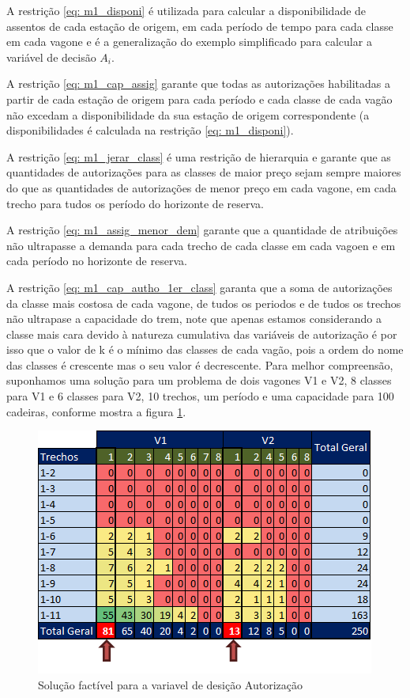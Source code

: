 A restrição \ref{eq: m1_disponi} é utilizada para calcular a disponibilidade de assentos de cada estação de origem, em cada período de tempo para cada classe em cada vagone e é a generalização do exemplo simplificado para calcular a variável de decisão $A_i$.

A restrição \ref{eq: m1_cap_assig} garante que todas as autorizações habilitadas a partir de cada estação de origem para cada período e cada classe de cada vagão não excedam a disponibilidade da sua estação de origem correspondente (a disponibilidades é calculada na restrição \ref{eq: m1_disponi}).

A restrição \ref{eq: m1_jerar_class} é uma restrição de hierarquia e garante que as quantidades de autorizações para as classes de maior preço sejam sempre maiores do que as quantidades de autorizações de menor preço em cada vagone, em cada trecho para tudos os período do horizonte de reserva.

A restrição \ref{eq: m1_assig_menor_dem} garante que a quantidade de atribuições não ultrapasse a demanda para cada trecho de cada classe em cada vagoen e em cada período no horizonte de reserva.

A restrição \ref{eq: m1_cap_autho_1er_class} garanta que a soma de autorizações da classe mais costosa de cada vagone, de tudos os periodos e de tudos os trechos não ultrapase a capacidade do trem, note que apenas estamos considerando a classe mais cara devido à natureza cumulativa das variáveis de autorização é por isso que o valor de k é o mínimo das classes de cada vagão, pois a ordem do nome das classes é crescente mas o seu valor é decrescente. Para melhor compreensão, suponhamos uma solução para um problema de dois vagones V1 e V2, 8 classes para V1 e 6 classes para V2, 10 trechos, um período e uma capacidade para 100 cadeiras, conforme mostra a figura \ref{fig: autorization}.

\begin{figure}[!ht]
	\begin{center}
		\includegraphics[scale=0.7]{img/autorization.png}
		\caption{Solução factível para a variavel de desição Autorização}
		\label{fig: autorization}
	\end{center}
\end{figure}

